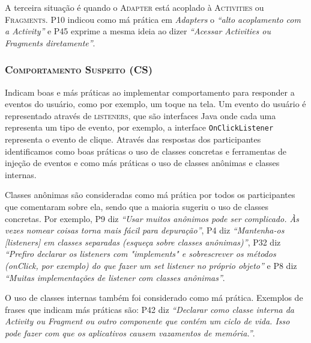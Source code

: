 A terceira situação é quando o \textsc{Adapter} está acoplado à \textsc{Activities} ou \textsc{Fragments}. P10 indicou como má prática em \textit{Adapters} o \textit{``alto acoplamento com a Activity''} e P45 exprime a mesma ideia ao dizer \textit{``Acessar Activities ou Fragments diretamente''}. 


\subsubsection{\textsc{Comportamento Suspeito (CS)}}
Indicam boas e más práticas ao implementar comportamento para responder a eventos do usuário, como por exemplo, um toque na tela. Um evento do usuário é representado através de \textsc{listeners}, que são interfaces Java onde cada uma representa um tipo de evento, por exemplo, a interface \texttt{OnClickListener} representa o evento de clique. Através das respostas dos participantes identificamos como boas práticas o uso de classes concretas e ferramentas de injeção de eventos e como más práticas o uso de classes anônimas e classes internas.

Classes anônimas são consideradas como má prática por todos os participantes que comentaram sobre ela, sendo que a maioria sugeriu o uso de classes concretas. Por exemplo, P9 diz \textit{``Usar muitos anônimos pode ser complicado. Às vezes nomear coisas torna mais fácil para depuração''}, P4 diz \textit{``Mantenha-os [listeners] em classes separadas (esqueça sobre classes anônimas)''}, P32 diz \textit{``Prefiro declarar os listeners com "implements" e sobrescrever os métodos (onClick, por exemplo) do que fazer um set listener no próprio objeto''} e P8 diz \textit{``Muitas implementações de listener com classes anônimas''}.

O uso de classes internas também foi considerado como má prática. Exemplos de frases que indicam más práticas são: P42 diz \textit{``Declarar como classe interna da Activity ou Fragment ou outro componente que contém um ciclo de vida. Isso pode fazer com que os aplicativos causem vazamentos de memória.''}.

